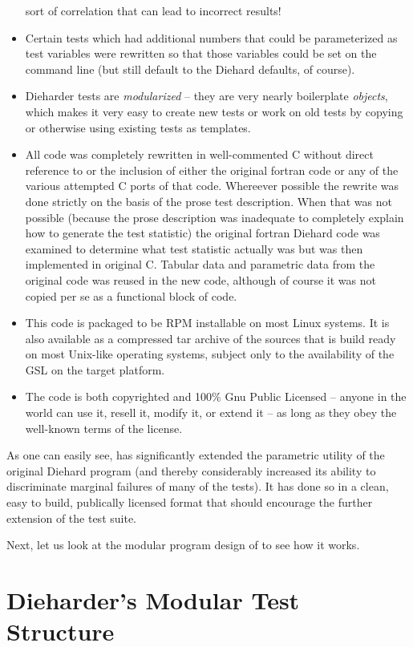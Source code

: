 \documentclass{book}
\begin{document}
\begin{itemize}
sort of correlation that can lead to incorrect results!
 \item Certain tests which had additional numbers that could be
parameterized as test variables were rewritten so that those variables
could be set on the command line (but still default to the Diehard
defaults, of course).
 \item Dieharder tests are {\em modularized} -- they are very nearly
boilerplate {\em objects}, which makes it very easy to create new tests
or work on old tests by copying or otherwise using existing tests as
templates.
 \item All code was completely rewritten in well-commented C without
direct reference to or the inclusion of either the original fortran code
or any of the various attempted C ports of that code.  Whereever
possible the rewrite was done strictly on the basis of the prose test
description.  When that was not possible (because the prose description
was inadequate to completely explain how to generate the test statistic)
the original fortran Diehard code was examined to determine what test
statistic actually was but was then implemented in original C.  Tabular
data and parametric data from the original code was reused in the new
code, although of course it was not copied per se as a functional block
of code.
 \item This code is packaged to be RPM installable on most Linux
systems.  It is also available as a compressed tar archive of the
sources that is build ready on most Unix-like operating systems, subject
only to the availability of the GSL on the target platform.
 \item The \die code is both copyrighted and 100\% Gnu Public
Licensed -- anyone in the world can use it, resell it, modify it, or
extend it -- as long as they obey the well-known terms of the license.
\end{itemize}

As one can easily see, \die has significantly extended the parametric
utility of the original Diehard program (and thereby considerably
increased its ability to discriminate marginal failures of many of the
tests).  It has done so in a clean, easy to build, publically licensed
format that should encourage the further extension of the \die test
suite.

Next, let us look at the modular program design of \die to see how
it works.

\chapter{Dieharder's Modular Test Structure}
\end{document}
